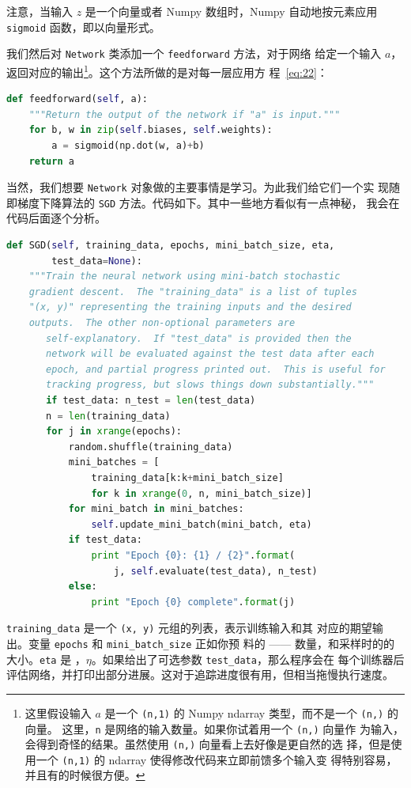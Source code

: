 注意，当输入 $z$ 是一个向量或者 Numpy 数组时，Numpy 自动地按元素应用
\lstinline!sigmoid! 函数，即以向量形式。

我们然后对 \lstinline!Network! 类添加一个 \lstinline!feedforward! 方法，对于网络
给定一个输入 $a$，返回对应的输出\footnote{这里假设输入 $a$ 是一个
  \lstinline!(n,1)! 的 Numpy ndarray 类型，而不是一个 \lstinline!(n,)! 的向量。
  这里，\lstinline!n! 是网络的输入数量。如果你试着用一个 \lstinline!(n,)! 向量作
  为输入，会得到奇怪的结果。虽然使用 \lstinline!(n,)! 向量看上去好像是更自然的选
  择，但是使用一个 \lstinline!(n,1)! 的 ndarray 使得修改代码来立即前馈多个输入变
  得特别容易，并且有的时候很方便。}。这个方法所做的是对每一层应用方
程~\eqref{eq:22}：
\begin{lstlisting}[language=Python]
def feedforward(self, a):
    """Return the output of the network if "a" is input."""
    for b, w in zip(self.biases, self.weights):
        a = sigmoid(np.dot(w, a)+b)
    return a
\end{lstlisting}

当然，我们想要 \lstinline!Network! 对象做的主要事情是学习。为此我们给它们一个实
现随即梯度下降算法的 \lstinline!SGD! 方法。代码如下。其中一些地方看似有一点神秘，
我会在代码后面逐个分析。
\begin{lstlisting}[language=Python]
def SGD(self, training_data, epochs, mini_batch_size, eta,
        test_data=None):
    """Train the neural network using mini-batch stochastic
    gradient descent.  The "training_data" is a list of tuples
    "(x, y)" representing the training inputs and the desired
    outputs.  The other non-optional parameters are
       self-explanatory.  If "test_data" is provided then the
       network will be evaluated against the test data after each
       epoch, and partial progress printed out.  This is useful for
       tracking progress, but slows things down substantially."""
       if test_data: n_test = len(test_data)
       n = len(training_data)
       for j in xrange(epochs):
           random.shuffle(training_data)
           mini_batches = [
               training_data[k:k+mini_batch_size]
               for k in xrange(0, n, mini_batch_size)]
           for mini_batch in mini_batches:
               self.update_mini_batch(mini_batch, eta)
           if test_data:
               print "Epoch {0}: {1} / {2}".format(
                   j, self.evaluate(test_data), n_test)
           else:
               print "Epoch {0} complete".format(j)
\end{lstlisting}

\lstinline!training_data! 是一个 \lstinline!(x, y)! 元组的列表，表示训练输入和其
对应的期望输出。变量 \lstinline!epochs! 和 \lstinline!mini_batch_size! 正如你预
料的 —— \epochs{}数量，和采样时的\minibatch{}的大小。\lstinline!eta! 是%
\learningrate{}，$\eta$。如果给出了可选参数 \lstinline!test_data!，那么程序会在
每个训练器后评估网络，并打印出部分进展。这对于追踪进度很有用，但相当拖慢执行速度。


